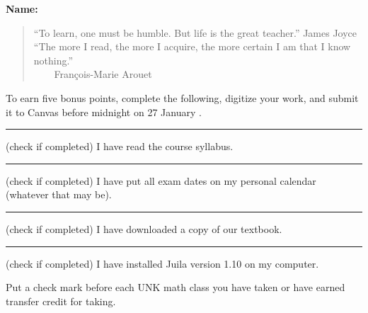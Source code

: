 \documentclass[12pt,fleqn,answers]{exam}
\begin{document}
\large
\vspace{0.1in}
\noindent{}
{\bf Name:}  \\
\noindent {}
\vspace{0.1in}

\begin{quote}
    “To learn, one must be humble. But life is the great teacher.”
   \hfill{\sc James Joyce} \\ 
   
    ``The more I read, the more I acquire, the more certain I am that 
    I know \mbox{nothing.}''  \\ $\phantom{xxx}$ \hfill{\sc François-Marie Arouet}
\end{quote}

\noindent  To earn five bonus points, complete the following, digitize your work, and submit it to Canvas before
midnight on 27 January \the\year.


\begin{questions} 

\question \rule{1cm}{0.15mm}  (check if completed) I have read the course syllabus.

\question  \rule{1cm}{0.15mm} (check if completed) I have put all exam dates on my personal calendar (whatever  that 
may be).

\question  \rule{1cm}{0.15mm} (check if completed) I have downloaded a copy of our textbook.

\question   \rule{1cm}{0.15mm} (check if completed) I have  installed Juila version 1.10 on my computer.

\question Put a check mark before each UNK math class you have taken or have earned transfer credit for taking.


\end{questions}
\end{document}
